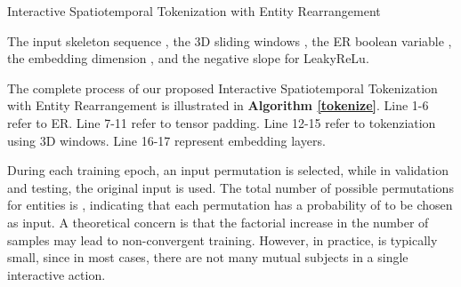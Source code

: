 \documentclass[letterpaper, 10 pt, conference]{ieeeconf}
\begin{document}
\begin{algorithm}[t]
\renewcommand{\algorithmicrequire}{\textbf{Input:}}
	\renewcommand{\algorithmicensure}{\textbf{Output:}}
	\caption{Interactive Spatiotemporal Tokenization with Entity Rearrangement}  
	\label{tokenize}
	\begin{algorithmic}[1]
 	    \Require The input skeleton sequence , the 3D sliding windows , the ER boolean variable , the embedding dimension , and the negative slope  for LeakyReLu.
		\If{}
		\State{}
		\Else
		\State{}
		\EndIf
        \State{}
        \Statex{}
        \State{}
        \Statex{}
        
		\State{\Return{}}
	\end{algorithmic}
\end{algorithm}


The complete process of our proposed Interactive Spatiotemporal Tokenization with Entity Rearrangement is illustrated in \textbf{Algorithm \ref{tokenize}}. Line 1-6 refer to ER. Line 7-11 refer to tensor padding. Line 12-15 refer to tokenziation using 3D windows. Line 16-17 represent embedding layers.

During each training epoch, an input permutation  is selected, while in validation and testing, the original input  is used. The total number of possible permutations for entities is , indicating that each permutation has a probability of  to be chosen as input. A theoretical concern is that the factorial increase in the number of samples may lead to non-convergent training. However, in practice,  is typically small, since in most cases, there are not many mutual subjects in a single interactive action.
\end{document}
